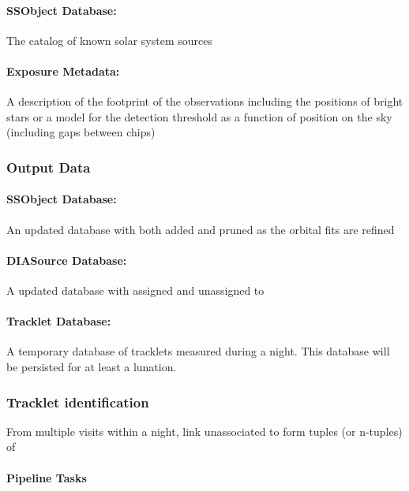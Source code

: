 \paragraph*{SSObject Database: } The catalog of known solar system sources

\paragraph*{Exposure Metadata:} A description of the footprint of the observations including the positions of bright stars or a model for the detection threshold as a function of position on the sky (including gaps between chips)


\subsubsection{Output Data}

\paragraph*{SSObject Database: } An updated \SSObject database with \SSObjects both added and pruned as the orbital fits are refined

\paragraph*{DIASource Database:} A updated \DIASource database with \DIASources assigned and unassigned to \SSObjects

\paragraph*{Tracklet Database:} A temporary database of tracklets measured during a night. This database will be persisted for at least a lunation.

\subsubsection{Tracklet identification}

From multiple visits within a night, link unassociated \DIASources to form tuples (or n-tuples) of \DIASources

\paragraph{Pipeline Tasks}

